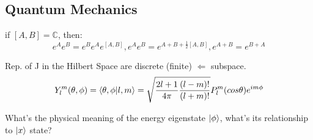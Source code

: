 \subsection{Quantum Mechanics}
\begin{description}[style=nextline]
    \item [Baker-Campbell-Hausdorff]	
	if $[A,B] = \mathbb{C}$, then:	\\
	$$e^{A}e^{B} = e^{B}e^{A}e^{[A,B]}, e^{A}e^{B} =
	e^{A+B+\frac{1}{2}[A,B]}, e^{A+B} = e^{B+A}$$
    \item [Angular Momentum] Rep. of J in the Hilbert Space are discrete
	(finite) $\Leftarrow$ subspace.
	$$Y^m_l(\theta,\phi) = \bra{\theta,\phi}\ket{l,m} =
	\sqrt{\frac{2l+1}{4\pi}\frac{(l-m)!}{(l+m)!}}P^m_l(cos\theta)e^{im\phi} $$
    \item [Harmonic Oscillator]	What's the physical meaning of the energy
	eigenstate $\ket{\phi}$, what's its relationship to $\ket{x}$ state?
\end{description}
